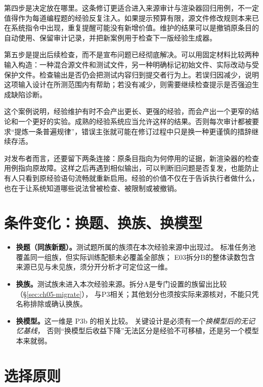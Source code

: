 第四步是决定放在哪里。这条修订更适合进入来源审计与渲染器回归用例，不一定值得作为每道编程题的经验反复注入。如果提示预算有限，源文件修改规则本来已在系统指令中出现，重复提醒可能没有新增价值。维护的结果可以是撤销原条目的自动使用、保留审计记录，并把新案例用于检查下一版经验生成器。

第五步是提出后续检查，而不是宣布问题已经彻底解决。可以用固定材料比较两种输入构造：一种混合源文件和测试文件，另一种明确标记初始文件、实际改动与受保护文件。检查输出是否仍会把测试内容归到提交者行为上。若误归因减少，说明这项输入设计在所测范围内有帮助；若没有减少，则需要继续检查提示是否强迫生成缺陷诊断。

这个案例说明，经验维护有时不会产出更长、更强的经验，而会产出一个更窄的结论和一个更好的实验。成熟的经验系统应当允许这样的结果。否则每次审计都被要求“提炼一条普遍规律”，错误主张就可能在修订过程中只是换一种更谨慎的措辞继续存活。

对发布者而言，还要留下两条连接：原条目指向为何停用的证据，新渲染器的检查用例指向原故障。这样之后再遇到相似输出，可以判断旧问题是否复发，也能防止有人只看到原经验语句流畅就重新启用。经验的价值不仅在于告诉执行者做什么，也在于让系统知道哪些说法曾被检查、被限制或被撤销。


\section{条件变化：换题、换族、换模型}
\label{sec:ch05-conditions}

\begin{itemize}
  \item \textbf{换题（同族新题）。}测试题所属的族须在本次经验来源中出现过。
        标准任务池覆盖同一组族，但实际训练配额未必覆盖全部族；
        E03拆分B的整体读数包含来源已见与未见族，须分开分析才可定位这一维。
  \item \textbf{换族。}测试族未进入本次经验来源。拆分A是专门设置的族留出比较（§\ref{sec:ch05-migrate}），
        与P3相关；其他划分也须按实际来源核对，不能只凭名称排除或确认换族。
  \item \textbf{换模型。}这一维是 P3b 的相关比较。
        关键设计是必须有一个\emph{换模型后的无记忆基线}，
        否则``换模型后收益下降''无法区分是经验不可移植，还是另一个模型本来就弱。
\end{itemize}

\section{选择原则}
\label{sec:ch05-choice}

